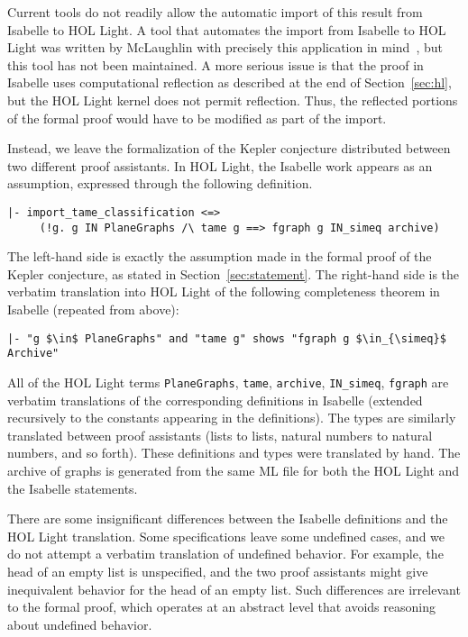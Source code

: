 Current tools do not readily allow the automatic import of this result
from Isabelle to HOL Light.  A tool that automates the import from
Isabelle to HOL Light was written by McLaughlin with precisely this
application in mind~\cite{McLaughlin:2006:IJCAR}, but this tool has
not been maintained.  A more serious issue is that the proof in
Isabelle uses computational reflection as described at the end of
Section~\ref{sec:hl}, but the HOL Light kernel does not permit
reflection.  Thus, the reflected portions of the formal proof would
have to be modified as part of the import.

Instead, we leave the formalization of the Kepler conjecture
distributed between two different proof assistants.  In HOL Light, the
Isabelle work appears as an assumption, expressed through the
following definition.
\begin{obeylines}

\begin{verbatim}
|- import_tame_classification <=>
     (!g. g IN PlaneGraphs /\ tame g ==> fgraph g IN_simeq archive)
\end{verbatim}

\end{obeylines}
The left-hand side is exactly the assumption made in the formal proof
of the Kepler conjecture, as stated in Section~\ref{sec:statement}.
The right-hand side is the verbatim translation into HOL Light of the following
completeness theorem in Isabelle (repeated from above):


\begin{lstlisting}[keepspaces=true,stringstyle=\tt,basicstyle=\small,%
frame=none,framesep=8pt,mathescape,morekeywords={and,shows},columns=flexible]
|- "g $\in$ PlaneGraphs" and "tame g" shows "fgraph g $\in_{\simeq}$ Archive"
\end{lstlisting}

All of the HOL Light terms
\verb!PlaneGraphs!, \verb!tame!, \verb!archive!, \verb!IN_simeq!,
\verb!fgraph! are verbatim translations of the corresponding
definitions in Isabelle (extended recursively to the constants
appearing in the definitions).  The types are similarly translated
between proof assistants (lists to lists, natural numbers to natural
numbers, and so forth).  These definitions and types were translated
by hand.  The archive of graphs is generated from the same ML file for
both the HOL Light and the Isabelle statements.  

There are some insignificant differences between the Isabelle
definitions and the HOL Light translation.  Some specifications leave
some undefined cases, and we do not attempt a verbatim translation of
undefined behavior.  For example, the head of an empty list is
unspecified, and the two proof assistants might give inequivalent
behavior for the head of an empty list.  Such differences are
irrelevant to the formal proof, which operates at an abstract level
that avoids reasoning about undefined behavior.  

